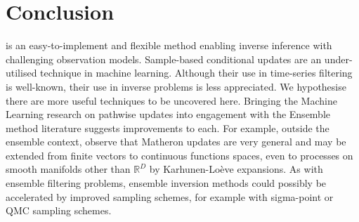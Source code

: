 \section{Conclusion}

\meth{} is an easy-to-implement and flexible method enabling inverse inference with challenging observation models.
Sample-based conditional updates are an under-utilised technique in machine learning.
Although their use in time-series filtering is well-known, their use in inverse problems is less appreciated.
We hypothesise there are more useful techniques to be uncovered here.
Bringing the Machine Learning research on pathwise updates into engagement with the Ensemble method literature suggests improvements to each.
For example, outside the ensemble context, \citet{WilsonPathwise2021} observe that Matheron updates are very general and may be extended from finite vectors to continuous functions spaces, even to processes on smooth manifolds other than \(\mathbb{R}^{D}\) by Karhunen-Lo\`eve expansions. 
As with ensemble  filtering problems, ensemble inversion methods could possibly be accelerated by improved sampling schemes, for example with sigma-point or QMC sampling schemes.

